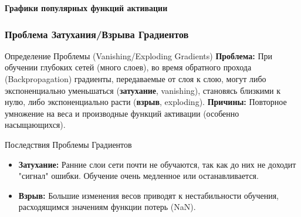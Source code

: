 \begin{myblock}{}
    {\noindent\small\bfseries\color{mDarkTeal}Графики популярных функций активации\par\vspace{1ex}}
    \begin{center}
    \end{center}
\end{myblock}

\subsubsection{Проблема Затухания/Взрыва Градиентов}
\begin{alerttextbox}{Определение Проблемы (Vanishing/Exploding Gradients)}
    \textbf{Проблема:} При обучении глубоких сетей (много слоев), во время обратного прохода (Backpropagation) градиенты, передаваемые от слоя к слою, могут либо экспоненциально уменьшаться (\textbf{затухание}, vanishing), становясь близкими к нулю, либо экспоненциально расти (\textbf{взрыв}, exploding).
    \textbf{Причины:} Повторное умножение на веса и производные функций активации (особенно насыщающихся).
\end{alerttextbox}

\begin{myblock}{Последствия Проблемы Градиентов}
    \begin{itemize}[nosep, leftmargin=*]
        \item \textbf{Затухание:} Ранние слои сети почти не обучаются, так как до них не доходит "сигнал" ошибки. Обучение очень медленное или останавливается.
        \item \textbf{Взрыв:} Большие изменения весов приводят к нестабильности обучения, расходящимся значениям функции потерь (NaN).
    \end{itemize}
\end{myblock}

